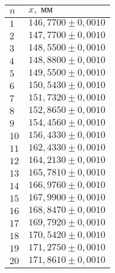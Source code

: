 \begin{tabular}{|l|l|}
\hline
$n$ & $x,\;\text{мм}$\\\hline
$1$ & $146{,}7700 \pm 0{,}0010$\\\hline
$2$ & $147{,}7700 \pm 0{,}0010$\\\hline
$3$ & $148{,}5500 \pm 0{,}0010$\\\hline
$4$ & $148{,}8800 \pm 0{,}0010$\\\hline
$5$ & $149{,}5500 \pm 0{,}0010$\\\hline
$6$ & $150{,}5430 \pm 0{,}0010$\\\hline
$7$ & $151{,}7320 \pm 0{,}0010$\\\hline
$8$ & $152{,}8650 \pm 0{,}0010$\\\hline
$9$ & $154{,}4560 \pm 0{,}0010$\\\hline
$10$ & $156{,}4330 \pm 0{,}0010$\\\hline
$11$ & $162{,}4330 \pm 0{,}0010$\\\hline
$12$ & $164{,}2130 \pm 0{,}0010$\\\hline
$13$ & $165{,}7810 \pm 0{,}0010$\\\hline
$14$ & $166{,}9760 \pm 0{,}0010$\\\hline
$15$ & $167{,}9900 \pm 0{,}0010$\\\hline
$16$ & $168{,}8470 \pm 0{,}0010$\\\hline
$17$ & $169{,}7920 \pm 0{,}0010$\\\hline
$18$ & $170{,}5420 \pm 0{,}0010$\\\hline
$19$ & $171{,}2750 \pm 0{,}0010$\\\hline
$20$ & $171{,}8610 \pm 0{,}0010$\\\hline
\end{tabular}
